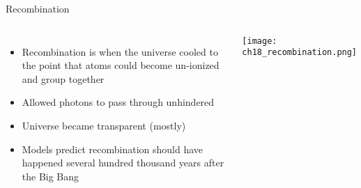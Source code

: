 \documentclass[pdf,aspectratio=169]{beamer}
\begin{document}

\begin{frame}{Recombination}
  \begin{columns}
	\begin{itemize}
	  \item Recombination is when the universe cooled to the point that atoms could become un-ionized and group together
	  \item Allowed photons to pass through unhindered
	  \item Universe became transparent (mostly)
	  \item Models predict recombination should have happened several hundred thousand years after the Big Bang
	\end{itemize}
	\begin{center}
	  \texttt{[image: ch18\_recombination.png]}
	\end{center}
  \end{columns}
\end{frame}
\end{document}
